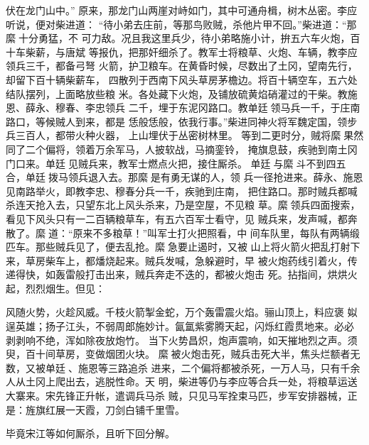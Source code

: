 伏在龙门山中。”
原来，那龙门山两崖对峙如门，其中可通舟楫，树木丛密。李应听说，便对柴进道：
“待小弟去庄前，等那鸟败贼，杀他片甲不回。”柴进道：“那縻十分勇猛，不
可力敌。况且我这里兵少，待小弟略施小计，拚五六车火炮，百十车柴薪，与唐斌
等报仇，把那奸细杀了。教军士将粮草、火炮、车辆，教李应领兵三千，都备弓弩
火箭，护卫粮车。在黄昏时候，尽数出了土冈，望南先行，却留下百十辆柴薪车，
四散列于西南下风头草房茅檐边。将百十辆空车，五六处结队摆列，上面略放些粮
米。各处藏下火炮，及铺放硫黄焰硝灌过的干柴。教施恩、薛永、穆春、李忠领兵
二千，埋于东泥冈路口。教单廷领马兵一千，于庄南路口，等候贼人到来，都是
恁般恁般，依我行事。”柴进同神火将军魏定国，领步兵三百人，都带火种火器，
上山埋伏于丛密树林里。
等到二更时分，贼将縻果然同了二个偏将，领着万余军马，人披软战，马摘銮铃，
掩旗息鼓，疾驰到南土冈门口来。单廷见贼兵来，教军士燃点火把，接住厮杀。
单廷与縻斗不到四五合，单廷拨马领兵退入去。那縻是有勇无谋的人，领
兵一径抢进来。薛永、施恩见南路举火，即教李忠、穆春分兵一千，疾驰到庄南，
把住路口。那时贼兵都喊杀连天抢入去，只望东北上风头杀来，乃是空屋，不见粮
草。縻领兵四面搜索，看见下风头只有一二百辆粮草车，有五六百军士看守，见
贼兵来，发声喊，都奔散了。縻道：“原来不多粮草！”叫军士打火把照看，中
间车队里，每队有两辆缎匹车。那些贼兵见了，便去乱抢。縻急要止遏时，又被
山上将火箭火把乱打射下来，草房柴车上，都燔烧起来。贼兵发喊，急躲避时，早
被火炮药线引着火，传递得快，如轰雷般打击出来，贼兵奔走不迭的，都被火炮击
死。拈指间，烘烘火起，烈烈烟生。但见：

风随火势，火趁风威。千枝火箭掣金蛇，万个轰雷震火焰。骊山顶上，料应褒
姒逞英雄；扬子江头，不弱周郎施妙计。氤氲紫雾腾天起，闪烁红霞贯地来。必必
剥剥响不绝，浑如除夜放炮竹。
当下火势昌炽，炮声震响，如天摧地烈之声。须臾，百十间草房，变做烟团火块。
縻被火炮击死，贼兵击死大半，焦头烂额者无数，又被单廷、施恩等三路追杀
进来，二个偏将都被杀死，一万人马，只有千余人从土冈上爬出去，逃脱性命。天
明，柴进等仍与李应等合兵一处，将粮草运送大寨来。宋先锋正升帐，遣调兵马杀
贼，只见马军拴束马匹，步军安排器械，正是：旌旗红展一天霞，刀剑白铺千里雪。

毕竟宋江等如何厮杀，且听下回分解。